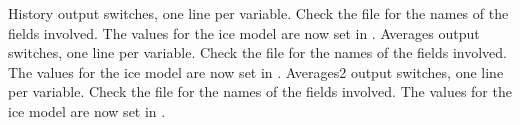 \begin{klist}
    \mbox{}
     \begin{klist}
        History output switches, one line per variable.
Check the  file for the names of the fields involved. The
 values for the ice model are now set in .
        Averages output switches, one line per variable.
Check the  file for the names of the fields involved. The
 values for the ice model are now set in .
        Averages2 output switches, one line per variable.
Check the  file for the names of the fields involved. The
 values for the ice model are now set in .

\end{klist}
\end{klist}
